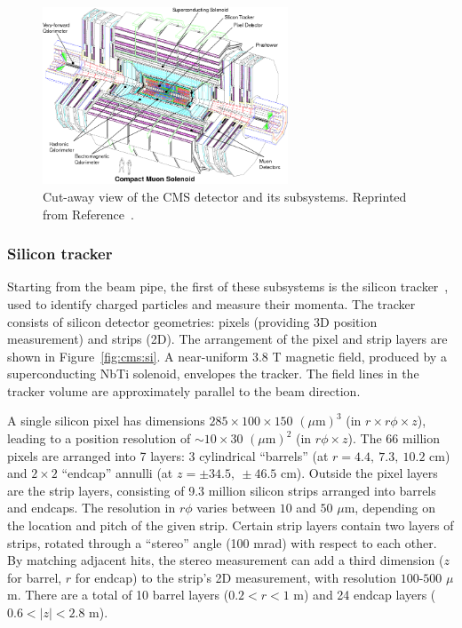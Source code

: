 \begin{figure}[]
    \begin{center}
        \includegraphics[width=0.65\textwidth]{figures/cms/cms.png}
        \caption{Cut-away view of the CMS detector and its subsystems.
                 Reprinted from Reference~\cite{cmsjinst}.}
        \label{fig:cms:cms}
    \end{center}
\end{figure}

\subsubsection{Silicon tracker}

Starting from the beam pipe, the first of these subsystems is the silicon tracker~\cite{cmstracker}, used to identify charged particles and measure their momenta. 
The tracker consists of silicon detector geometries: pixels (providing 3D position measurement) and strips (2D). 
The arrangement of the pixel and strip layers are shown in Figure~\ref{fig:cms:si}.
A near-uniform 3.8 T magnetic field, produced by a superconducting NbTi solenoid, envelopes the tracker. 
The field lines in the tracker volume are approximately parallel to the beam direction. 

A single silicon pixel has dimensions $285\times100\times150$ $(\mu\mathrm{m})^3$ (in $r\times r\phi\times z$), leading to a position resolution of $\sim10\times30$ $(\mu\mathrm{m})^2$ (in $r\phi\times z$). 
The 66 million pixels are arranged into 7 layers: 3 cylindrical ``barrels'' (at $r=4.4,~7.3,~10.2$ cm) and $2\times2$ ``endcap'' annulli (at $z=\pm34.5,~\pm46.5$ cm). 
Outside the pixel layers are the strip layers, consisting of 9.3 million silicon strips arranged into barrels and endcaps.
The resolution in $r\phi$ varies between $10$ and $50$ $\mu$m, depending on the location and pitch of the given strip.
Certain strip layers contain two layers of strips, rotated through a ``stereo'' angle (100 mrad) with respect to each other.
By matching adjacent hits, the stereo measurement can add a third dimension ($z$ for barrel, $r$ for endcap) to the strip's 2D measurement, with resolution $100$-$500$ $\mu$m.
There are a total of 10 barrel layers ($0.2 < r < 1$ m) and 24 endcap layers ($0.6 < |z| < 2.8$ m). 

